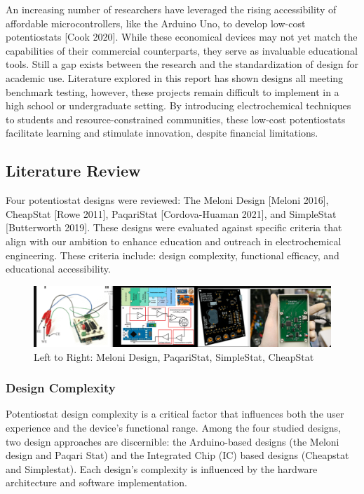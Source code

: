 \documentclass{article}
\begin{document}
An increasing number of researchers have leveraged the rising accessibility of affordable microcontrollers, like the Arduino Uno, to develop low-cost potentiostats [Cook 2020]. While these economical devices may not yet match the capabilities of their commercial counterparts, they serve as invaluable educational tools. Still a gap exists between the research and the standardization of design for academic use. Literature explored in this report has shown designs all meeting benchmark testing, however, these projects remain difficult to implement in a high school or undergraduate setting. By introducing electrochemical techniques to students and resource-constrained communities, these low-cost potentiostats facilitate learning and stimulate innovation, despite financial limitations.


\subsection*{Literature Review}
Four potentiostat designs were reviewed: The Meloni Design [Meloni 2016], CheapStat [Rowe 2011], PaqariStat [Cordova-Huaman 2021], and SimpleStat [Butterworth 2019]. These designs were evaluated against specific criteria that align with our ambition to enhance education and outreach in electrochemical engineering. These criteria include: design complexity, functional efficacy, and educational accessibility.
\begin{figure}[H]
\centering
\includegraphics[width=1\linewidth]{review.png}
\caption{Left to Right: Meloni Design, PaqariStat, SimpleStat, CheapStat}
\end{figure}
\subsubsection*{Design Complexity}
Potentiostat design complexity is a critical factor that influences both the user experience and the device's functional range. Among the four studied designs, two design approaches are discernible: the Arduino-based designs (the Meloni design and Paqari Stat) and the Integrated Chip (IC) based designs (Cheapstat and Simplestat). Each design's complexity is influenced by the hardware architecture and software implementation.
\end{document}
